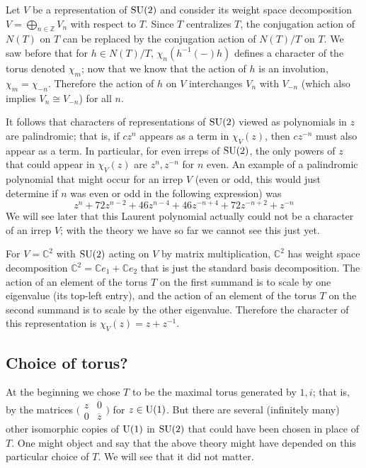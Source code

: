 \documentclass[../../rtnotes.tex]{subfiles}
\begin{document}
Let $V$ be a representation of $\operatorname{SU}(2)$ and consider its weight space decomposition $V = \bigoplus_{n\in\mathbb Z}V_n$ with respect to $T$. Since $T$ centralizes $T$, the conjugation action of $N(T)$ on $T$ can be replaced by the conjugation action of $N(T)/T$ on $T$. We saw before that for $h\in N(T)/T$, $\chi_n(h^{-1}(-)h)$ defines a character of the torus denoted $\chi_m$; now that we know that the action of $h$ is an involution, $\chi_m = \chi_{-n}$. Therefore the action of $h$ on $V$ interchanges $V_n$ with $V_{-n}$ (which also implies $V_n\cong V_{-n}$) for all $n$.

It follows that characters of representations of $\operatorname{SU}(2)$ viewed as polynomials in $z$ are palindromic; that is, if $cz^n$ appears as a term in $\chi_V(z)$, then $cz^{-n}$ must also appear as a term. In particular, for even irreps of $\operatorname{SU}(2)$, the only powers of $z$ that could appear in $\chi_V(z)$ are $z^n,z^{-n}$ for $n$ even. An example of a palindromic polynomial that might occur for an irrep $V$ (even or odd, this would just determine if $n$ was even or odd in the following expression) was 
\[z^n + 72z^{n-2} + 46z^{n-4} + 46z^{-n+4} + 72z^{-n+2} + z^{-n}\]
We will see later that this Laurent polynomial actually could not be a character of an irrep $V$; with the theory we have so far we cannot see this just yet.

For $V = \mathbb C^2$ with $\operatorname{SU}(2)$ acting on $V$ by matrix multiplication, $\mathbb C^2$ has weight space decomposition $\mathbb C^2 = \mathbb Ce_1 + \mathbb Ce_2$ that is just the standard basis decomposition. The action of an element of the torus $T$ on the first summand is to scale by one eigenvalue (its top-left entry), and the action of an element of the torus $T$ on the second summand is to scale by the other eigenvalue. Therefore the character of this representation is $\chi_V(z) = z+z^{-1}$.

\subsection{Choice of torus?}
At the beginning we chose $T$ to be the maximal torus generated by $1,i$; that is, by the matrices $\bigl(\!\begin{smallmatrix}
    z & 0 \\ 0 & \overline z
\end{smallmatrix}\!\bigr)$ for $z\in\operatorname{U}(1)$. But there are several (infinitely many) other isomorphic copies of $\operatorname{U}(1)$ in $\operatorname{SU}(2)$ that could have been chosen in place of $T$. One might object and say that the above theory might have depended on this particular choice of $T$. We will see that it did not matter. 
\end{document}
